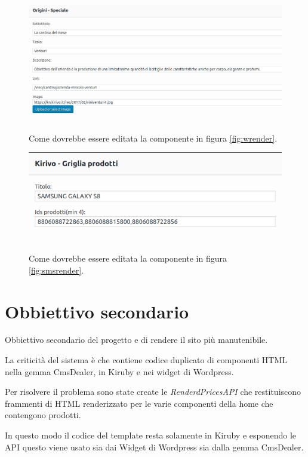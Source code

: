 \begin{figure}
  \includegraphics[width=\textwidth]{figure/wform.png}
  \caption{Come dovrebbe essere editata la componente in figura \ref{fig:wrender}.}
  \label{fig:meseform}
\end{figure}

\begin{figure}
  \includegraphics[width=\textwidth]{figure/sms-form.png}
  \caption{Come dovrebbe essere editata la componente in figura \ref{fig:smsrender}.}
  \label{fig:smsform}
\end{figure}

\section{Obbiettivo secondario}
Obbiettivo secondario del progetto e di rendere il sito più manutenibile.

La criticità del sistema è che contiene codice duplicato di componenti HTML nella gemma CmsDealer, in Kiruby
e nei widget di Wordpress. 

Per risolvere il problema sono state create le  \emph{RenderdPricesAPI} 
che restituiscono frammenti di HTML renderizzato per le varie componenti della home che contengono prodotti.

In questo modo il codice del template resta solamente in Kiruby e esponendo le 
API questo viene usato sia dai Widget di Wordpress sia dalla gemma CmsDealer.